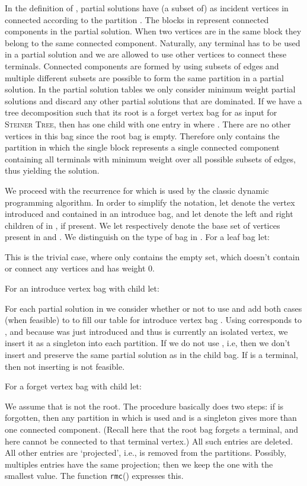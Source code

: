 \documentclass{llncs}
\begin{document}
In the definition of ,
partial solutions have (a subset of)  as incident vertices in  connected according to the partition . The blocks in  represent connected components in the partial solution. When two vertices are in the same block they belong to
the same connected component. Naturally,
any terminal  has to be used in a partial solution and we are allowed to use other vertices to connect these terminals. Connected components are formed by using subsets  of edges and multiple different subsets are possible to form the same partition in a partial solution. In the partial solution tables  we only consider minimum weight partial solutions and discard any other partial solutions that are dominated. If we have a tree decomposition  such that its root is a forget vertex bag for  as input for \textsc{Steiner Tree}, then  has one child  with one entry in  where . There are no other vertices in this bag since the root bag is empty.
Therefore  only contains the partition  in which the single block represents a single connected component containing all terminals with minimum weight over all possible subsets of edges, thus yielding the solution.

We proceed with the recurrence for  which is used by the classic dynamic programming algorithm. In order to simplify the notation, let  denote the vertex introduced and contained in an introduce bag, and let  denote the left and right children of  in , if present. We let  respectively  denote the base set of vertices present in  and . We distinguish on the type of bag in . For a leaf bag  let:


This is the trivial case, where  only contains the empty set, which doesn't contain or connect any vertices and has weight 0. 

For an introduce vertex  bag  with child  let:


For each partial solution in  we consider whether or not to use  and add both cases (when feasible) to  to fill our table for introduce vertex bag . Using  corresponds to , and because  was just introduced and thus is currently an isolated vertex,
we insert it as a singleton into each partition. 
If we do not use , i.e,  then we don't insert  and preserve the same partial solution as in the child bag. If  is a terminal, then not inserting  is not feasible. 

For a forget vertex  bag  with child  let:


We assume that  is not the root.
The procedure basically does two steps: if  is forgotten, then any partition in which  is used and is a singleton gives more than one connected component. (Recall here
that the root bag forgets a terminal, and here  cannot be connected to that terminal vertex.) All such entries are deleted. All other entries are `projected', i.e.,
 is removed from the partitions. Possibly, multiples entries have the same projection; then we keep the one with the smallest value. The function  \texttt{rmc}() expresses this.
\end{document}

